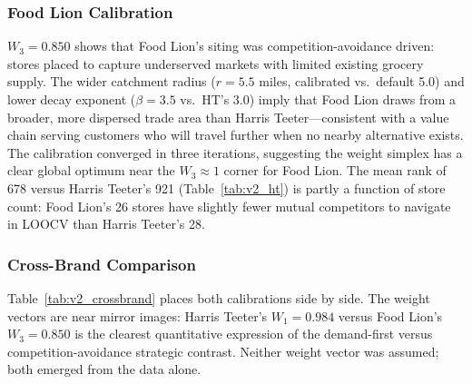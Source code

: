 \documentclass[conference]{IEEEtran}
\begin{document}
\subsubsection{Food Lion Calibration}

\begin{table}[!t]
\centering
\caption{V2: Food Lion Calibrated Weights \& Configuration Comparison
         (26 FL stores, 2,450 candidates)}
\label{tab:v2_fl}
\end{table}

$W_3 = 0.850$ shows that Food Lion's siting was competition-avoidance
driven: stores placed to capture underserved markets with limited
existing grocery supply. The wider catchment radius ($r = 5.5$ miles,
calibrated vs.\ default 5.0) and lower decay exponent ($\beta = 3.5$
vs.\ HT's 3.0) imply that Food Lion draws from a broader, more
dispersed trade area than Harris Teeter---consistent with a value
chain serving customers who will travel further when no nearby
alternative exists. The calibration converged in three iterations,
suggesting the weight simplex has a clear global optimum near the
$W_3 \approx 1$ corner for Food Lion. The mean rank of 678 versus
Harris Teeter's 921 (Table~\ref{tab:v2_ht}) is partly a function of
store count: Food Lion's 26 stores have slightly fewer mutual
competitors to navigate in LOOCV than Harris Teeter's 28.

\subsubsection{Cross-Brand Comparison}

Table~\ref{tab:v2_crossbrand} places both calibrations side by side.
The weight vectors are near mirror images: Harris Teeter's $W_1 = 0.984$
versus Food Lion's $W_3 = 0.850$ is the clearest quantitative
expression of the demand-first versus competition-avoidance strategic
contrast. Neither weight vector was assumed; both emerged from the
data alone.
\end{document}
